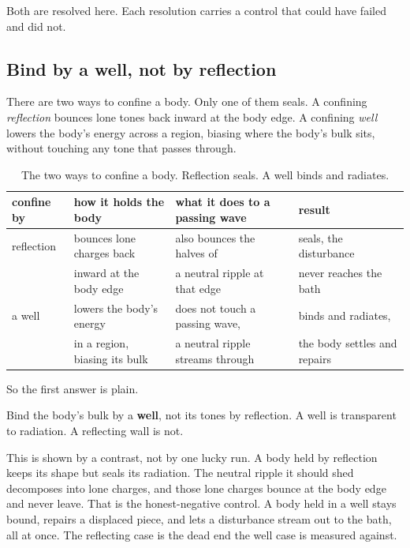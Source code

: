 Both are resolved here. Each resolution carries a control that could have failed and did not.

\subsection{Bind by a well, not by reflection}

There are two ways to confine a body. Only one of them seals. A confining \emph{reflection} bounces lone tones back inward at the body edge. A confining \emph{well} lowers the body's energy across a region, biasing where the body's bulk sits, without touching any tone that passes through.

\begin{table}[ht]
\centering
\begin{tabular}{@{}llll@{}}
\toprule
confine by & how it holds the body & what it does to a passing wave & result \\
\midrule
reflection & bounces lone charges back & also bounces the halves of & seals, the disturbance \\
 & inward at the body edge & a neutral ripple at that edge & never reaches the bath \\
\addlinespace
a well & lowers the body's energy & does not touch a passing wave, & binds and radiates, \\
 & in a region, biasing its bulk & a neutral ripple streams through & the body settles and repairs \\
\bottomrule
\end{tabular}
\caption{The two ways to confine a body. Reflection seals. A well binds and radiates.}
\label{tab:confine-well-vs-reflection}
\end{table}

So the first answer is plain.

\begin{principle}
Bind the body's bulk by a \textbf{well}, not its tones by reflection. A well is transparent to radiation. A reflecting wall is not.
\end{principle}

This is shown by a contrast, not by one lucky run. A body held by reflection keeps its shape but seals its radiation. The neutral ripple it should shed decomposes into lone charges, and those lone charges bounce at the body edge and never leave. That is the honest-negative control. A body held in a well stays bound, repairs a displaced piece, and lets a disturbance stream out to the bath, all at once. The reflecting case is the dead end the well case is measured against.

